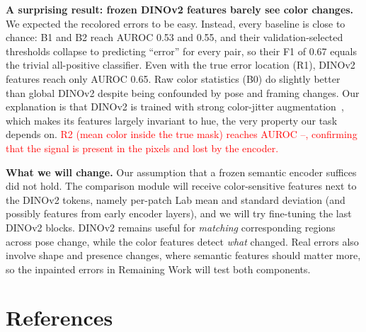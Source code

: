\documentclass{article}
\newcommand{\XX}[1]{\textcolor{red}{#1}}
\begin{document}
\textbf{A surprising result: frozen DINOv2 features barely see color changes.} We expected the
recolored errors to be easy. Instead, every baseline is close to chance: B1 and B2 reach AUROC 0.53 and
0.55, and their validation-selected thresholds collapse to predicting ``error'' for every pair, so their
F1 of 0.67 equals the trivial all-positive classifier. Even with the true error location (R1), DINOv2
features reach only AUROC 0.65. Raw color statistics (B0) do slightly better than global DINOv2 despite
being confounded by pose and framing changes. Our explanation is that DINOv2 is trained with strong
color-jitter augmentation~\cite{oquab2023dinov2}, which makes its features largely invariant to hue,
the very property our task depends on. \XX{R2 (mean color inside the true mask) reaches AUROC --,
confirming that the signal is present in the pixels and lost by the encoder.}

\textbf{What we will change.} Our assumption that a frozen semantic encoder suffices did not hold.
The comparison module will receive color-sensitive features next to the DINOv2 tokens, namely per-patch
Lab mean and standard deviation (and possibly features from early encoder layers), and we will try
fine-tuning the last DINOv2 blocks. DINOv2 remains useful for \emph{matching} corresponding regions
across pose change, while the color features detect \emph{what} changed. Real errors also involve shape
and presence changes, where semantic features should matter more, so the inpainted errors in Remaining
Work will test both components.

\section*{References}
\medskip
{\small
\renewcommand{\bibsection}{}


}
\end{document}
